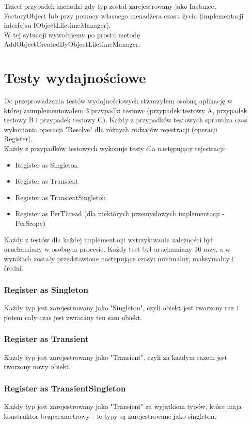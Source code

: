 \documentclass[12pt]{article}
\begin{document}
Trzeci przypadek zachodzi gdy typ został zarejestrowany jako Instance, FactoryObject lub przy pomocy własnego menadżera czasu życia (implementacji interfejsu IObjectLifetimeManager).\\
W tej sytuacji wywołujemy po prostu metodę AddObjectCreatedByObjectLifetimeManager.



\clearpage
\section{Testy wydajnościowe}
Do przeprowadzania testów wydajnościowych stworzyłem osobną aplikację w której zaimplementowałem 3 przypadki testowe (przypadek testowy A, przypadek testowy B i przypadek testowy C). Każdy z przypadków testowych sprawdza czas wykoniania operacji "Resolve" dla różnych rodzajów rejestracji (operacji Register).\\
Każdy z przypadków testowych wykonuje testy dla następujący rejestracji:
\begin{itemize}
	\item Register as Singleton
	\item Register as Transient
	\item Register as TransientSingleton
	\item Register as PerThread (dla niektórych przemysłowych implementacji - PerScope)
\end{itemize}
Każdy z testów dla każdej implementacji wstrzykiwania zależności był uruchamiany w osobnym procesie. Każdy test był uruchamiany {\color{red}10} razy, a w wynikach zostały przedstawione następujące czasy: minimalny,  maksymalny i średni.

\subsubsection{Register as Singleton}
Każdy typ jest zarejestrowany jako "Singleton", czyli obiekt jest tworzony raz i potem cały czas jest zwracany ten sam obiekt.

\subsubsection{Register as Transient}
Każdy typ jest zarejestrowany jako "Transient", czyli za każdym razem jest tworzony nowy obiekt.

\subsubsection{Register as TransientSingleton}
Każdy typ jest zarejestrowany jako "Transient" za wyjątkiem typów, które maja konstruktor bezparametrowy - te typy są zarejestrowane jako singleton.
\end{document}
